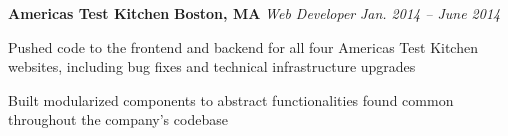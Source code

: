 \item
\headerrow
{\textbf{Americas Test Kitchen}}
{\textbf{Boston, MA}}
\headerrow
{\emph{Web Developer}}
{\emph{Jan. 2014 -- June 2014}}
\begin{itemize*}
    \item Pushed code to the frontend and backend for all four Americas Test
    Kitchen websites, including bug fixes and technical infrastructure
    upgrades
    \item Built modularized components to abstract functionalities found common
    throughout the company's codebase
\end{itemize*}
